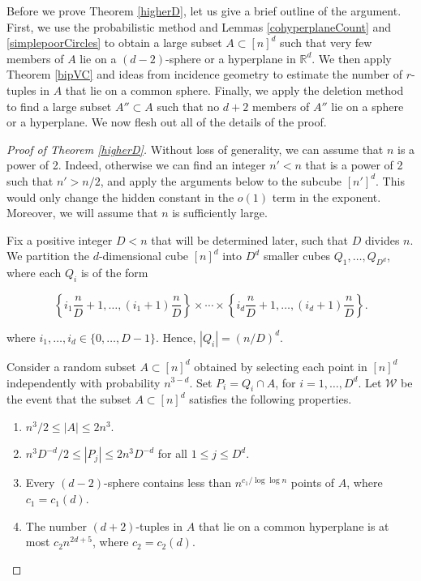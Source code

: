 \documentclass[11pt]{article}
\theoremstyle{plain}
\theoremstyle{definition}
\theoremstyle{remark}
\begin{document}
\medskip


Before we prove Theorem \ref{higherD}, let us give a brief outline of the argument.  First, we use the probabilistic method and Lemmas \ref{cohyperplaneCount} and \ref{simplepoorCircles} to obtain a large subset $A\subset [n]^d$ such that very few members of $A$ lie on a $(d-2)$-sphere or a hyperplane in $\mathbb{R}^d$.  We then apply Theorem \ref{bipVC} and ideas from incidence geometry to estimate the number of $r$-tuples in $A$ that lie on a common sphere.  Finally, we apply the deletion method to find a large subset $A'' \subset A$ such that no $d+2$ members of $A''$ lie on a sphere or a hyperplane.  We now flesh out all of the details of the proof.
\medskip

\begin{proof}[Proof of Theorem \ref{higherD}]
    Without loss of generality, we can assume that $n$ is a power of 2.  Indeed, otherwise we can find an integer $n' < n$ that is a power of 2 such that $n' > n/2$, and apply the arguments below to the subcube $[n']^d$.  This would only change the hidden constant in the $o(1)$ term in the exponent.  Moreover, we will assume that $n$ is sufficiently large.

Fix a positive integer $D < n$ that will be determined later, such that $D$ divides $n$. We partition the $d$-dimensional cube $[n]^d$ into $D^d$ smaller cubes $Q_1,\ldots, Q_{D^d}$, where each $Q_i$ is of the form
 

    $$\left\{i_1 \frac{n}{D}  + 1,\ldots, (i_1 + 1) \frac{n}{D} \right\}\times \cdots \times \left\{i_d\frac{n}{D} + 1,\ldots, (i_d + 1) \frac{n}{D} \right\}.$$
    
\noindent where $i_1,\ldots, i_d \in \{0,\ldots, D-1\}$. Hence, $|Q_i| = (n/D)^d$. 




Consider a random subset $A\subset [n]^d$ obtained by selecting each point in $[n]^d$ independently with probability $n^{3-d}$.   Set $P_i = Q_i\cap A$, for $i = 1,\ldots, D^d$. Let $\mathcal{W}$ be the event that the subset $A\subset [n]^d$ satisfies the following properties. 


\begin{enumerate}
    \item $n^3/2 \leq |A| \leq 2n^3$.
    \item $n^3D^{-d}/2 \leq |P_j| \leq 2n^3D^{-d}$ for all $1 \leq j \leq D^d$.
    \item Every $(d-2)$-sphere contains less than $n^{c_1/\log\log n}$ points of $A$, where $c_1 = c_1(d)$.
    \item The number $(d+2)$-tuples in $A$ that lie on a common hyperplane is at most $c_2n^{2d+5}$, where $c_2 = c_2(d)$.
\end{enumerate}


\end{proof}
\end{document}
